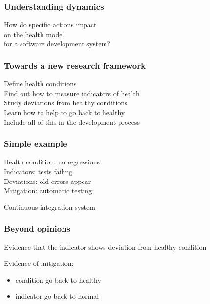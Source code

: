 \documentclass[17pt,aspectratio=169,hyperref=pdfusetitle]{beamer}
\begin{document}
\begin{frame}[fragile]
  \frametitle{Understanding dynamics}

  How do specific actions impact \\
  on the health model \\
  for a software development system?
\end{frame}

\begin{frame}[fragile]
  \frametitle{Towards a new research framework}

  Define health conditions \\
  Find out how to measure indicators of health \\
  Study deviations from healthy conditions \\
  Learn how to help to go back to healthy \\

  Include all of this in the development process
\end{frame}

\begin{frame}[fragile]
  \frametitle{Simple example}

  Health condition: no regressions \\
  Indicators: tests failing \\
  Deviations: old errors appear \\
  Mitigation: automatic testing \\

  \begin{center}
    Continuous integration system
  \end{center}
\end{frame}

\begin{frame}[fragile]
  \frametitle{Beyond opinions}

  Evidence that the indicator shows
  deviation from healthy condition

  \vspace{.5cm}
  
  Evidence of mitigation:

  \begin{itemize}
  \item condition go back to healthy
  \item indicator go back to normal
  \end{itemize}
  
\end{frame}
\end{document}
